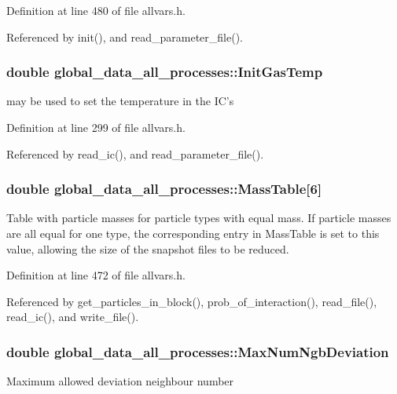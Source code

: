 Definition at line 480 of file allvars.h.



Referenced by init(), and read\_\-parameter\_\-file().

\hypertarget{structglobal__data__all__processes_a633fbd557554f7932dab2641d15e6ea1}{
\subsubsection[{InitGasTemp}]{\setlength{\rightskip}{0pt plus 5cm}double {\bf global\_\-data\_\-all\_\-processes::InitGasTemp}}}
\label{structglobal__data__all__processes_a633fbd557554f7932dab2641d15e6ea1}
may be used to set the temperature in the IC's 

Definition at line 299 of file allvars.h.



Referenced by read\_\-ic(), and read\_\-parameter\_\-file().

\hypertarget{structglobal__data__all__processes_a0d1dbe97a03958559781d9619f8b17c1}{
\subsubsection[{MassTable}]{\setlength{\rightskip}{0pt plus 5cm}double {\bf global\_\-data\_\-all\_\-processes::MassTable}\mbox{[}6\mbox{]}}}
\label{structglobal__data__all__processes_a0d1dbe97a03958559781d9619f8b17c1}
Table with particle masses for particle types with equal mass. If particle masses are all equal for one type, the corresponding entry in MassTable is set to this value, allowing the size of the snapshot files to be reduced. 

Definition at line 472 of file allvars.h.



Referenced by get\_\-particles\_\-in\_\-block(), prob\_\-of\_\-interaction(), read\_\-file(), read\_\-ic(), and write\_\-file().

\hypertarget{structglobal__data__all__processes_a388690a6ee1497eea2f19e3984afa088}{
\subsubsection[{MaxNumNgbDeviation}]{\setlength{\rightskip}{0pt plus 5cm}double {\bf global\_\-data\_\-all\_\-processes::MaxNumNgbDeviation}}}
\label{structglobal__data__all__processes_a388690a6ee1497eea2f19e3984afa088}
Maximum allowed deviation neighbour number 


